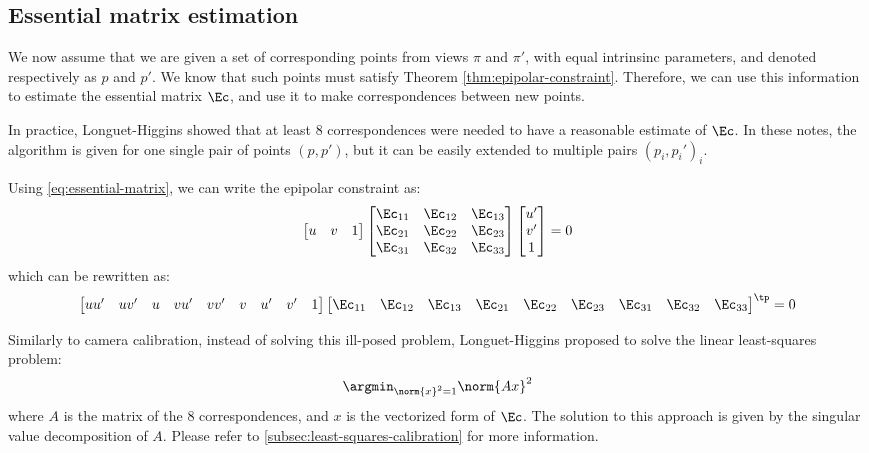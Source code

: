 \subsection{Essential matrix estimation}
We now assume that we are given a set of corresponding points from views $\pi$ and $\pi'$, with equal intrinsinc parameters, and denoted respectively as $p$ and $p'$. We know that such points must satisfy Theorem \ref{thm:epipolar-constraint}. Therefore, we can use this information to estimate the essential matrix $\Ec$, and use it to make correspondences between new points.

\begin{remark}
    In practice, Longuet-Higgins showed that at least 8 correspondences were needed to have a reasonable estimate of $\Ec$. In these notes, the algorithm is given for one single pair of points $(p,p')$, but it can be easily extended to multiple pairs $(p_i,p_i')_i$.
\end{remark}

Using \autoref{eq:essential-matrix}, we can write the epipolar constraint as:
\begin{equation}
    \begin{bmatrix}u&v&1\end{bmatrix}
    \begin{bmatrix}
        \Ec_{11} & \Ec_{12} & \Ec_{13} \\
        \Ec_{21} & \Ec_{22} & \Ec_{23} \\
        \Ec_{31} & \Ec_{32} & \Ec_{33}
    \end{bmatrix}
    \begin{bmatrix}u'\\v'\\1\end{bmatrix}=0
\end{equation}
which can be rewritten as:
\begin{equation*}
    \begin{bmatrix}
        uu' & uv' & u & vu' & vv' & v & u' & v' & 1
    \end{bmatrix}
    \begin{bmatrix}
        \Ec_{11} & \Ec_{12} & \Ec_{13} & \Ec_{21} & \Ec_{22} & \Ec_{23} & \Ec_{31} & \Ec_{32} & \Ec_{33}
    \end{bmatrix}^\tp=0
\end{equation*}

Similarly to camera calibration, instead of solving this ill-posed problem, Longuet-Higgins proposed to solve the linear least-squares problem:
\begin{equation}
    \label{eq:least-squares-essential}
    \argmin_{\norm{x}^2=1} \norm{Ax}^2
\end{equation}
where $A$ is the matrix of the $8$ correspondences, and $x$ is the vectorized form of $\Ec$. The solution to this approach is given by the singular value decomposition of $A$. Please refer to \autoref{subsec:least-squares-calibration} for more information.

